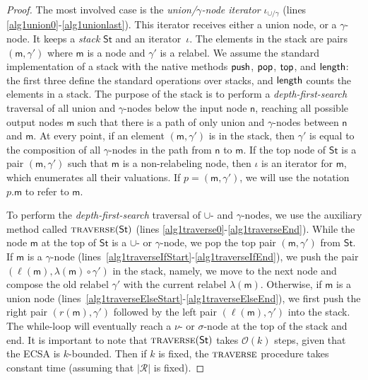 \documentclass[
a4paper
]{article}
\theoremstyle{plain}
\theoremstyle{definition}
\theoremstyle{remark}
\newcommand{\Reg}{\mathcal{R}}
\newcommand{\n}{\textsf{n}}
\newcommand{\m}{\textsf{m}}
\newcommand{\bnodelabel}{\m}
\newcommand{\uit}{\iota}
\newcommand{\ustack}{\operatorname{St}}
\newcommand{\cO}{\mathcal{O}}
\renewcommand{\operatorname}[1]{\textsf{#1}}
\begin{document}
\begin{proof}
	The most involved case is the \emph{union/$\gamma$-node iterator} $\uit_{\cup/\gamma}$ (lines \ref{alg1union0}-\ref{alg1unionlast}). 
	This iterator receives either a union node, or a $\gamma$-node. It keeps a \emph{stack} $\ustack$ and an iterator~$\uit$. The elements in the stack are pairs $(\bnodelabel, \gamma')$ where $\bnodelabel$ is a node and $\gamma'$ is a relabel. We assume the standard implementation of a stack with the native methods $\text{\sf push}$, $\text{\sf pop}$, $\text{\sf top}$, and $\text{\sf length}$: the first three define the standard operations over stacks, and $\text{\sf length}$ counts the elements in a stack. 
	The purpose of the stack is to perform a \emph{depth-first-search} traversal of all union and $\gamma$-nodes below the input node $\n$, reaching all possible output nodes $\bnodelabel$ such that there is a path of only union and $\gamma$-nodes between $\n$ and $\bnodelabel$. At every point, if an element $(\bnodelabel,\gamma')$ is in the stack, then $\gamma'$ is equal to the composition of all $\gamma$-nodes in the path from $\n$ to $\bnodelabel$. If the top node of $\ustack$ is a pair $(\bnodelabel, \gamma')$ such that $\bnodelabel$ is a non-relabeling node, then $\uit$ is an iterator for $\bnodelabel$, which enumerates all their valuations. If $p = (\bnodelabel,\gamma')$, we will use the notation $p.\bnodelabel$ to refer to $\bnodelabel$.
	
	To perform the \emph{depth-first-search} traversal of $\cup$- and $\gamma$-nodes, we use the auxiliary method called $\textsc{traverse}(\ustack)$ (lines \ref{alg1traverse0}-\ref{alg1traverseEnd}). While the node $\bnodelabel$ at the top of $\ustack$ is a $\cup$- or $\gamma$-node, we pop the top pair $(\bnodelabel,\gamma')$ from $\ustack$. If $\bnodelabel$ is a $\gamma$-node (lines~\ref{alg1traverseIfStart}-\ref{alg1traverseIfEnd}), we push the pair $(\ell(\bnodelabel), \lambda(\m) \circ \gamma')$ in the stack, namely, we move to the next node and compose the old relabel $\gamma'$ with the current relabel $\lambda(\bnodelabel)$.
	Otherwise, if $\bnodelabel$ is a union node (lines~\ref{alg1traverseElseStart}-\ref{alg1traverseElseEnd}), we first push the right pair $(r(\bnodelabel), \gamma')$ followed by the left pair $(\ell(\bnodelabel), \gamma')$ into the stack. 	
	The while-loop will eventually reach a $\nu$- or $\sigma$-node at the top of the stack and end. 
	It is important to note that $\textsc{traverse}(\ustack)$ takes $\cO(k)$ steps, given that the ECSA is $k$-bounded. Then if $k$ is fixed, the  $\textsc{traverse}$ procedure takes constant time (assuming that $|\Reg|$ is fixed).
	

\end{proof}
\end{document}
